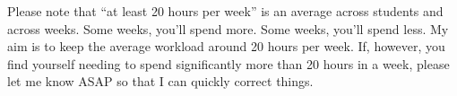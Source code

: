 \documentclass[12pt]{article}
\begin{document}
\begin{description}
Please note that ``at least 20 hours per week'' is an average across students and across weeks. Some weeks, you'll spend more. Some weeks, you'll spend less. My aim is to keep the average workload around 20 hours per week. If, however, you find yourself needing to spend significantly more than 20 hours in a week, please let me know ASAP so that I can quickly correct things.
\end{description}




\end{document}
